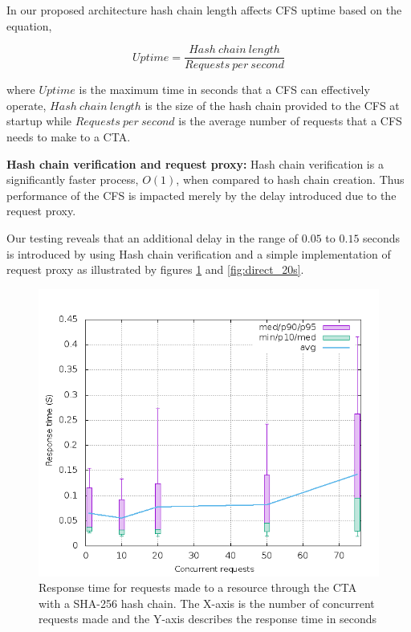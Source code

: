 \documentclass[a4paper,twoside]{article}
\begin{document}
In our proposed architecture hash chain length affects CFS uptime based on the equation,

\[
	Uptime = \frac{Hash\ chain\ length}{Requests\ per\  second} 
\]

where $Uptime$ is the maximum time in seconds that a CFS can effectively operate, $Hash\ chain\ length$ is the size of the hash chain provided to the CFS at startup while $Requests\ per\ second$ is the average number of requests that a CFS needs to make to a CTA.


\textbf{Hash chain verification and request proxy:}
Hash chain verification is a significantly faster process, $O(1)$, when compared to hash chain creation. Thus performance of the CFS is impacted merely by the delay introduced due to the request proxy. 

Our testing reveals that an additional delay in the range of $0.05$ to $0.15$ seconds is introduced by using Hash chain verification and a simple implementation of request proxy as illustrated by figures \ref{fig:verify_20s} and \ref{fig:direct_20s}.

\begin{figure}[h]
\includegraphics[width=\columnwidth]{verify_20s}
\caption{Response time for requests made to a resource through the CTA with a SHA-256 hash chain. The X-axis is the number of concurrent requests made and the Y-axis describes the response time in seconds}
\label{fig:verify_20s}
\end{figure}
\end{document}
